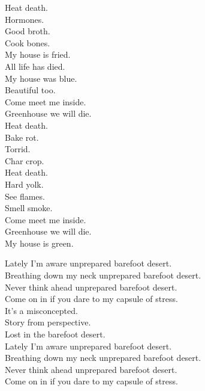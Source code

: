 Heat death. \\
Hormones. \\
Good broth. \\
Cook bones. \\

My house is fried. \\
All life has died. \\
My house was blue. \\
Beautiful too. \\

Come meet me inside. \\
Greenhouse we will die. \\

Heat death. \\
Bake rot. \\
Torrid. \\
Char crop. \\
Heat death. \\
Hard yolk. \\
See flames. \\
Smell smoke. \\

Come meet me inside. \\
Greenhouse we will die. \\
My house is green. \\




Lately I'm aware unprepared barefoot desert. \\
Breathing down my neck unprepared barefoot desert. \\
Never think ahead unprepared barefoot desert. \\
Come on in if you dare to my capsule of stress. \\

It's a misconcepted. \\
Story from perspective. \\
Lost in the barefoot desert. \\

Lately I'm aware unprepared barefoot desert. \\
Breathing down my neck unprepared barefoot desert. \\
Never think ahead unprepared barefoot desert. \\
Come on in if you dare to my capsule of stress. \\

